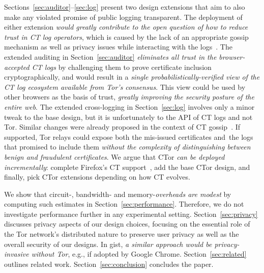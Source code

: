Sections~\ref{sec:auditor}--\ref{sec:log} present two design extensions that
aim to also make any violated promise of public logging transparent.  The
deployment of either extension
	\emph{would greatly contribute to the open question of how to reduce trust
	in CT log operators},
which is caused by the lack of an appropriate gossip mechanism as well as
privacy issues while interacting with the
logs~\cite{minimal-gossip,nordberg,ct-with-privacy}.
The extended auditing in Section~\ref{sec:auditor}
	\emph{eliminates all trust in the browser-accepted CT logs}
by challenging them to prove certificate inclusion cryptographically, and would
result in a
	\emph{single probabilistically-verified view of the CT log ecosystem
	available from Tor's consensus}.
This view could be used by other browsers as the basis of trust,
	\emph{greatly improving the security posture of the entire web}.
The extended cross-logging in Section~\ref{sec:log} involves only a minor tweak
to the base design, but it is unfortunately to the API of CT logs and not Tor.
Similar changes were already proposed in the context of CT
gossip~\cite{minimal-gossip}.  If supported, Tor relays could expose both the
mis-issued certificates and the logs that promised to include them \emph{without
the complexity of distinguishing between benign and fraudulent certificates}.
We argue that CTor \emph{can be deployed incrementally}:
	complete Firefox's CT support~\cite{ffct},
	add the base CTor design, and finally,
	pick CTor extensions depending on how CT evolves.

We show that circuit-, bandwidth- and memory-\emph{overheads are modest} by
computing such estimates in Section~\ref{sec:performance}.  Therefore, we
do not investigate performance further in any experimental setting.
Section~\ref{sec:privacy} discusses privacy aspects of our design choices,
focusing on the essential role of the Tor network's distributed nature
to preserve user privacy as well as the overall security of our designs.  In
gist, \emph{a similar approach would be privacy-invasive without Tor}, e.g.,
if adopted by Google Chrome.
Section~\ref{sec:related} outlines related work.
Section~\ref{sec:conclusion} concludes the paper.
